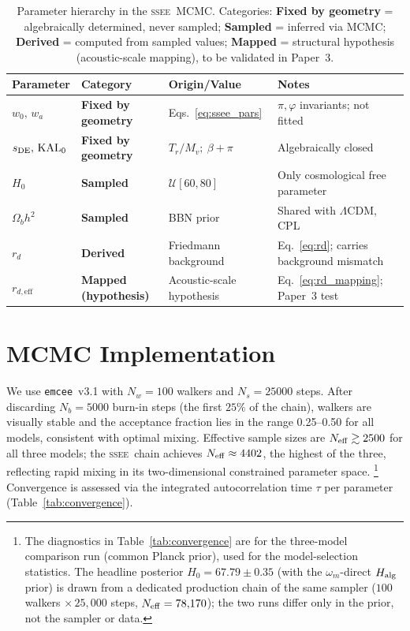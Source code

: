 \documentclass[12pt,a4paper]{article}
\newcommand{\SSEE}{\ifmmode\mathrm{SSEE}\else\textsc{ssee}\fi}
\newcommand{\LCDM}{\ifmmode\Lambda\mathrm{CDM}\else$\Lambda$CDM\fi}
\newcommand{\KALz}{\mathrm{KAL}_0}
\newcommand{\wz}{w_0}
\newcommand{\wa}{w_a}
\newcommand{\rdeff}{r_{d,\mathrm{eff}}}
\begin{document}
\begin{table}[H]
\centering
\caption{Parameter hierarchy in the \SSEE\ MCMC. Categories:
\textbf{Fixed by geometry} = algebraically determined, never sampled;
\textbf{Sampled} = inferred via MCMC; \textbf{Derived} = computed from
sampled values; \textbf{Mapped} = structural hypothesis (acoustic-scale mapping), to be validated in Paper~3.}
\label{tab:param_hierarchy}
\begin{tabular}{@{}lllp{4.2cm}@{}}
\toprule
Parameter & Category & Origin/Value & Notes \\
\midrule
$\wz,\,\wa$          & \textbf{Fixed by geometry} & Eqs.~\eqref{eq:ssee_pars} & $\pi,\varphi$ invariants; not fitted \\
$s_{\rm DE},\,\KALz$  & \textbf{Fixed by geometry} & $T_r/M_v;\ \beta+\pi$     & Algebraically closed \\
$H_0$                & \textbf{Sampled}           & $\mathcal{U}[60,80]$      & Only cosmological free parameter \\
$\Omega_b h^2$       & \textbf{Sampled}           & BBN prior                 & Shared with \LCDM, CPL \\
$r_d$                & \textbf{Derived}           & Friedmann background      & Eq.~\eqref{eq:rd}; carries background mismatch \\
$\rdeff$             & \textbf{Mapped (hypothesis)}& Acoustic-scale hypothesis & Eq.~\eqref{eq:rd_mapping}; Paper~3 test \\
\bottomrule
\end{tabular}
\end{table}

\section{MCMC Implementation}
\label{sec:mcmc}

We use \texttt{emcee}~v3.1 \citep{emcee} with $N_w=100$ walkers and
$N_s=25000$ steps. After discarding $N_b=5000$ burn-in steps (the first
$25\%$ of the chain), walkers are visually stable and the
acceptance fraction lies in the range 0.25--0.50 for all models,
consistent with optimal mixing. Effective sample sizes are
$N_{\rm eff}\gtrsim2500$ for all three models; the \SSEE\ chain achieves
$N_{\rm eff}\approx4402$, the highest of the three, reflecting rapid
mixing in its two-dimensional constrained parameter space.%
\footnote{The diagnostics in Table~\ref{tab:convergence} are for the
three-model comparison run (common Planck prior), used for the
model-selection statistics. The headline posterior $H_0=67.79\pm0.35$ (with the
$\omega_m$-direct $H_{\rm alg}$ prior) is drawn from a dedicated production chain of the
same sampler ($100$ walkers $\times\,25{,}000$ steps, $N_{\rm eff}=78{,}170$); the two
runs differ only in the prior, not the sampler or data.}
Convergence is assessed via the integrated autocorrelation time $\tau$
per parameter (Table~\ref{tab:convergence}).
\end{document}
